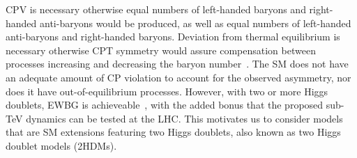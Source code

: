 CPV is necessary otherwise equal numbers of left-handed baryons and right-handed anti-baryons would be produced, as well as equal numbers of left-handed anti-baryons and right-handed baryons.
Deviation from thermal equilibrium is necessary otherwise CPT symmetry would assure compensation between processes increasing and decreasing the baryon number~\cite{ShaposhnikovFarrar1993BAU}.
The SM does not have an adequate amount of CP violation to account for the observed asymmetry, nor does it have out-of-equilibrium processes.
However, with two or more Higgs doublets, EWBG is achieveable~\cite{Bochkarev1990EWBG2HDM}, with the added bonus that the proposed sub-TeV dynamics can be tested at the LHC.
This motivates us to consider models that are SM extensions featuring two Higgs doublets, also known as two Higgs doublet models (2HDMs).